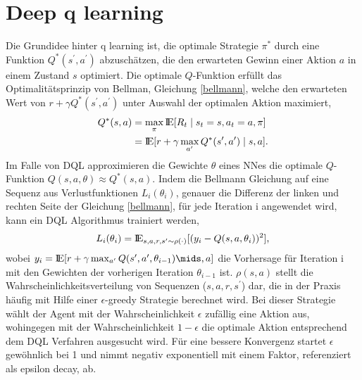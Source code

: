 \section{Deep q learning}
\label{sec:grundlagendql}

Die Grundidee hinter q learning ist, die optimale Strategie $\pi^\ast$ durch eine Funktion $Q^\ast(s^\prime,a^\prime)$ abzuschätzen, die den erwarteten Gewinn einer Aktion $a$ in einem Zustand $s$ optimiert. Die optimale $Q$-Funktion erfüllt das \glqq Optimalitätsprinzip von Bellman\grqq, Gleichung \ref{bellmann}, welche den erwarteten Wert von $r + \gamma Q^\ast(s^\prime,a^\prime)$ unter Auswahl der optimalen Aktion maximiert,
\begin{align}\label{bellmann}
Q^\ast(s,a) &= \max_\pi\mbox{I\negthinspace E}[R_t\mid s_t=s,a_t=a,\pi] \nonumber\\
&= \mbox{I\negthinspace E}[r+\gamma\max_{a^\prime}Q^\ast(s^\prime,a^\prime)\mid s,a]\textnormal{.}
\end{align}
Im Falle von \acs{DQL} approximieren die Gewichte $\theta$ eines \acs{NN}es die optimale $Q$-Funktion $Q(s,a,\theta)\approx Q^\ast(s,a)$.
Indem die Bellmann Gleichung auf eine Sequenz aus Verlustfunktionen $L_i(\theta_i)$, genauer die Differenz der linken und rechten Seite der Gleichung \ref{bellmann}, für jede Iteration i angewendet wird, kann ein \acs{DQL} Algorithmus trainiert werden,
\begin{align}
	L_i(\theta _i)=\mbox{I\negthinspace E} _{s,a,r,s^\prime\sim\rho(\cdot)}[(y_i - Q(s,a,\theta _i))^2]\textnormal{,}
\end{align}
wobei \(y_i=\E[r+\gamma\max_{a^\prime}Q(s^\prime,a^\prime,\theta _{i-1})\mids,a]\) die Vorhersage für Iteration i mit den Gewichten der vorherigen Iteration $\theta_{i-1}$ ist.
$\rho(s,a)$ stellt die Wahrscheinlichkeitsverteilung von Sequenzen ($s,a,r,s^\prime$) dar, die in der Praxis häufig mit Hilfe einer $\epsilon$-greedy Strategie berechnet wird. Bei dieser Strategie wählt der Agent mit der Wahrscheinlichkeit $\epsilon$ zufällig eine Aktion aus, wohingegen mit der Wahrscheinlichkeit $1-\epsilon$ die optimale Aktion entsprechend dem \acs{DQL} Verfahren ausgesucht wird. Für eine bessere Konvergenz startet $\epsilon$ gewöhnlich bei 1 und nimmt negativ exponentiell mit einem Faktor, referenziert als epsilon decay, ab.

